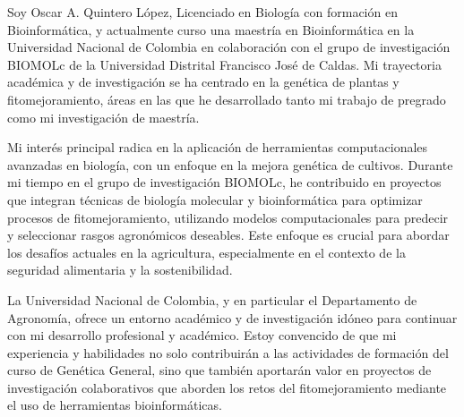 \documentclass[11pt, letterpaper]{awesome-cv} %
\begin{document}
\makecvheader %

\makelettertitle %


\begin{cvletter}



Soy Oscar A. Quintero López, Licenciado en Biología con formación en Bioinformática, y actualmente curso una maestría en Bioinformática en la Universidad Nacional de Colombia en colaboración con el grupo de investigación BIOMOLc de la Universidad Distrital Francisco José de Caldas. Mi trayectoria académica y de investigación se ha centrado en la genética de plantas y fitomejoramiento, áreas en las que he desarrollado tanto mi trabajo de pregrado como mi investigación de maestría.



Mi interés principal radica en la aplicación de herramientas computacionales avanzadas en biología, con un enfoque en la mejora genética de cultivos. Durante mi tiempo en el grupo de investigación BIOMOLc, he contribuido en proyectos que integran técnicas de biología molecular y bioinformática para optimizar procesos de fitomejoramiento, utilizando modelos computacionales para predecir y seleccionar rasgos agronómicos deseables. Este enfoque es crucial para abordar los desafíos actuales en la agricultura, especialmente en el contexto de la seguridad alimentaria y la sostenibilidad.



La Universidad Nacional de Colombia, y en particular el Departamento de Agronomía, ofrece un entorno académico y de investigación idóneo para continuar con mi desarrollo profesional y académico. Estoy convencido de que mi experiencia y habilidades no solo contribuirán a las actividades de formación del curso de Genética General, sino que también aportarán valor en proyectos de investigación colaborativos que aborden los retos del fitomejoramiento mediante el uso de herramientas bioinformáticas.


\end{cvletter}
\end{document}
